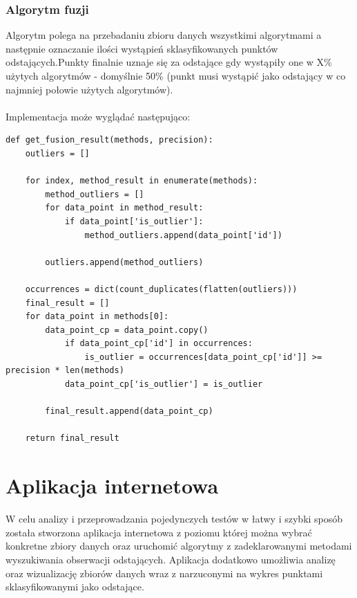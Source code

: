 \documentclass[eng,printmode]{mgr}
\begin{document}
\subsection{Algorytm fuzji}
Algorytm polega na przebadaniu zbioru danych wszystkimi algorytmami a następnie oznaczanie ilości wystąpień sklasyfikowanych punktów odstających.Punkty finalnie uznaje się za odstające gdy wystąpiły one w X\% użytych algorytmów - domyślnie 50\% (punkt musi wystąpić jako odstający w co najmniej połowie użytych algorytmów).
\\\\
Implementacja może wyglądać następująco:
\\
\begin{lstlisting}
def get_fusion_result(methods, precision):
    outliers = []

    for index, method_result in enumerate(methods):
        method_outliers = []
        for data_point in method_result:
            if data_point['is_outlier']:
                method_outliers.append(data_point['id'])

        outliers.append(method_outliers)

    occurrences = dict(count_duplicates(flatten(outliers)))
    final_result = []
    for data_point in methods[0]:
        data_point_cp = data_point.copy()
            if data_point_cp['id'] in occurrences:
                is_outlier = occurrences[data_point_cp['id']] >= precision * len(methods)
            data_point_cp['is_outlier'] = is_outlier

        final_result.append(data_point_cp)

    return final_result
\end{lstlisting}

\chapter{Aplikacja internetowa}
W celu analizy i przeprowadzania pojedynczych testów w łatwy i szybki sposób została stworzona aplikacja internetowa z poziomu której można wybrać konkretne zbiory danych oraz uruchomić algorytmy z zadeklarowanymi metodami wyszukiwania obserwacji odstających. Aplikacja dodatkowo umożliwia analizę oraz wizualizację zbiorów danych wraz z narzuconymi na wykres punktami sklasyfikowanymi jako odstające.
\end{document}
